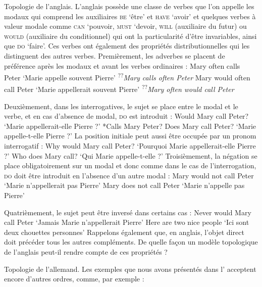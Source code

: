 {     Topologie de l’anglais. L’anglais possède une classe de verbes que l’on appelle les modaux qui comprend les auxiliaires \textsc{be} ‘être’ et \textsc{have} ‘avoir’ et quelques verbes à valeur modale comme \textsc{can} ‘pouvoir, \textsc{must} ‘devoir, \textsc{will} (auxiliaire du futur) ou \textsc{would} (auxiliaire du conditionnel) qui ont la particularité d’être invariables, ainsi que \textsc{do} ‘faire’. Ces verbes ont également des propriétés distributionnelles qui les distinguent des autres verbes. Premièrement, les adverbes se placent de préférence après les modaux et avant les verbes ordinaires :
    \ea
    {Mary often calls Peter}     ‘Marie appelle souvent Pierre’
    \z
    \ea
    {\textsuperscript{??}}\textit{Mary calls often Peter}
    \z
    \ea
    {Mary would often call Peter}   ‘Marie appellerait souvent Pierre’
    \z
    \ea
    {\textsuperscript{??}}\textit{Mary often would call Peter}
    \z

    Deuxièmement, dans les interrogatives, le sujet se place entre le modal et le verbe, et en cas d’absence de modal, \textsc{do} est introduit :
    \ea
    {Would Mary call Peter?}     ‘Marie appellerait-elle Pierre ?’
    \z
    \ea
    {*Calls Mary Peter?}
    \z
    \ea
    {Does Mary call Peter?}     ‘Marie appelle-t-elle Pierre ?’
    \z
    La position initiale peut aussi être occupée par un pronom interrogatif :
    \ea
    {Why would Mary call Peter?}   ‘Pourquoi Marie appellerait-elle Pierre ?’
    \z
    \ea
    {Who does Mary call?}     ‘Qui Marie appelle-t-elle ?’
    \z
    Troisièmement, la négation se place obligatoirement sur un modal et donc comme dans le cas de l’interrogation, \textsc{do} doit être introduit en l’absence d’un autre modal :
    \ea
    {Mary would not call Peter}     ‘Marie n’appellerait pas Pierre’
    \z
{}
    \z
    \ea
    {Mary does not call Peter}    ‘Marie n’appelle pas Pierre’
    \z

    Quatrièmement, le sujet peut être inversé dans certains cas :
    \ea
    {Never would Mary call Peter}   ‘Jamais Marie n’appellerait Pierre’
    \z
    \ea
    {Here are two nice people}     ‘Ici sont deux chouettes personnes’
    \z
    Rappelons également que, en anglais, l’objet direct doit précéder tous les autres compléments. De quelle façon un modèle topologique de l’anglais peut-il rendre compte de ces propriétés ?

     Topologie de l’allemand. Les exemples que nous avons présentés dans l’ acceptent encore d’autres ordres, comme, par exemple :

}
